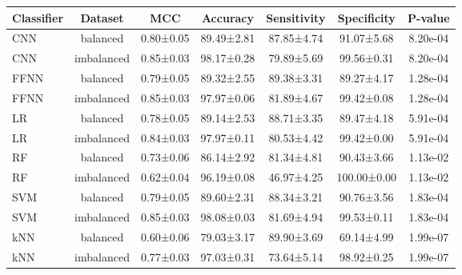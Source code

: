 \begin{tabular}{lcccccc}
\toprule
Classifier &    Dataset &       MCC &   Accuracy & Sensitivity & Specificity &  P-value \\
\midrule
       CNN &   balanced & 0.80±0.05 & 89.49±2.81 &  87.85±4.74 &  91.07±5.68 & 8.20e-04 \\
       CNN & imbalanced & 0.85±0.03 & 98.17±0.28 &  79.89±5.69 &  99.56±0.31 & 8.20e-04 \\
      FFNN &   balanced & 0.79±0.05 & 89.32±2.55 &  89.38±3.31 &  89.27±4.17 & 1.28e-04 \\
      FFNN & imbalanced & 0.85±0.03 & 97.97±0.06 &  81.89±4.67 &  99.42±0.08 & 1.28e-04 \\
        LR &   balanced & 0.78±0.05 & 89.14±2.53 &  88.71±3.35 &  89.47±4.18 & 5.91e-04 \\
        LR & imbalanced & 0.84±0.03 & 97.97±0.11 &  80.53±4.42 &  99.42±0.00 & 5.91e-04 \\
        RF &   balanced & 0.73±0.06 & 86.14±2.92 &  81.34±4.81 &  90.43±3.66 & 1.13e-02 \\
        RF & imbalanced & 0.62±0.04 & 96.19±0.08 &  46.97±4.25 & 100.00±0.00 & 1.13e-02 \\
       SVM &   balanced & 0.79±0.05 & 89.60±2.31 &  88.34±3.21 &  90.76±3.56 & 1.83e-04 \\
       SVM & imbalanced & 0.85±0.03 & 98.08±0.03 &  81.69±4.94 &  99.53±0.11 & 1.83e-04 \\
       kNN &   balanced & 0.60±0.06 & 79.03±3.17 &  89.90±3.69 &  69.14±4.99 & 1.99e-07 \\
       kNN & imbalanced & 0.77±0.03 & 97.03±0.31 &  73.64±5.14 &  98.92±0.25 & 1.99e-07 \\
\bottomrule
\end{tabular}
